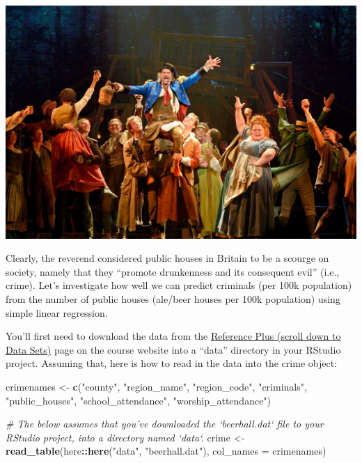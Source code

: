 \documentclass[]{article}
\newenvironment{Shaded}{\begin{snugshade}}{\end{snugshade}}
\newcommand{\CommentTok}[1]{\textcolor[rgb]{0.56,0.35,0.01}{\textit{#1}}}
\newcommand{\DataTypeTok}[1]{\textcolor[rgb]{0.13,0.29,0.53}{#1}}
\newcommand{\KeywordTok}[1]{\textcolor[rgb]{0.13,0.29,0.53}{\textbf{#1}}}
\newcommand{\NormalTok}[1]{#1}
\newcommand{\OperatorTok}[1]{\textcolor[rgb]{0.81,0.36,0.00}{\textbf{#1}}}
\newcommand{\StringTok}[1]{\textcolor[rgb]{0.31,0.60,0.02}{#1}}
\begin{document}
\includegraphics{../images/03.LesMiserables.US.MasteroftheHouse.jpg}

Clearly, the reverend considered public houses in Britain to be a
scourge on society, namely that they ``promote drunkenness and its
consequent evil'' (i.e., crime). Let's investigate how well we can
predict criminals (per 100k population) from the number of public houses
(ale/beer houses per 100k population) using simple linear regression.

You'll first need to download the data from the
\href{https://ohsu-math630-fall-2019.netlify.com/reference.html}{Reference
Plus (scroll down to Data Sets)} page on the course website into a
``data'' directory in your RStudio project. Assuming that, here is how
to read in the data into the crime object:

\begin{Shaded}
\begin{Highlighting}[]
\NormalTok{crimenames <-}\StringTok{ }\KeywordTok{c}\NormalTok{(}\StringTok{"county"}\NormalTok{, }\StringTok{"region_name"}\NormalTok{, }\StringTok{"region_code"}\NormalTok{,}
               \StringTok{"criminals"}\NormalTok{, }\StringTok{"public_houses"}\NormalTok{, }\StringTok{"school_attendance"}\NormalTok{,}
               \StringTok{"worship_attendance"}\NormalTok{)}

\CommentTok{# The below assumes that you've downloaded the `beerhall.dat` file to your RStudio project, into a directory named `data`.}
\NormalTok{crime <-}\StringTok{ }\KeywordTok{read_table}\NormalTok{(here}\OperatorTok{::}\KeywordTok{here}\NormalTok{(}\StringTok{"data"}\NormalTok{, }\StringTok{"beerhall.dat"}\NormalTok{),}
                    \DataTypeTok{col_names =}\NormalTok{ crimenames)}
\end{Highlighting}
\end{Shaded}
\end{document}
